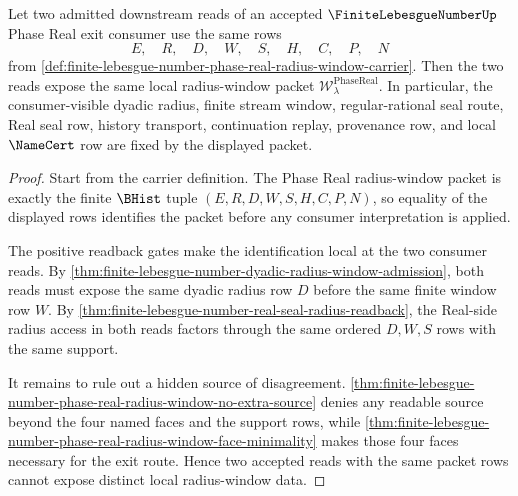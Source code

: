 \begin{theorem}
\label{thm:finite-lebesgue-number-phase-real-local-radius-determinacy}
Let two admitted downstream reads of an accepted $\FiniteLebesgueNumberUp$ Phase Real exit consumer use the same rows
$$
E,\quad R,\quad D,\quad W,\quad S,\quad H,\quad C,\quad P,\quad N
$$
from \autoref{def:finite-lebesgue-number-phase-real-radius-window-carrier}. Then the two reads expose the same local radius-window packet $\mathcal{W}_{\lambda}^{\mathrm{PhaseReal}}$. In particular, the consumer-visible dyadic radius, finite stream window, regular-rational seal route, Real seal row, history transport, continuation replay, provenance row, and local $\NameCert$ row are fixed by the displayed packet.
\end{theorem}
\begin{proof}
Start from the carrier definition. The Phase Real radius-window packet is exactly the finite $\BHist$ tuple $(E,R,D,W,S,H,C,P,N)$, so equality of the displayed rows identifies the packet before any consumer interpretation is applied.

The positive readback gates make the identification local at the two consumer reads. By \autoref{thm:finite-lebesgue-number-dyadic-radius-window-admission}, both reads must expose the same dyadic radius row $D$ before the same finite window row $W$. By \autoref{thm:finite-lebesgue-number-real-seal-radius-readback}, the Real-side radius access in both reads factors through the same ordered $D,W,S$ rows with the same support.

It remains to rule out a hidden source of disagreement. \autoref{thm:finite-lebesgue-number-phase-real-radius-window-no-extra-source} denies any readable source beyond the four named faces and the support rows, while \autoref{thm:finite-lebesgue-number-phase-real-radius-window-face-minimality} makes those four faces necessary for the exit route. Hence two accepted reads with the same packet rows cannot expose distinct local radius-window data.
\end{proof}

